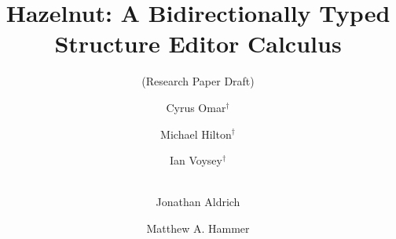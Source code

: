 \documentclass{llncs}
\begin{document}
%
\frontmatter          %

\mainmatter              %
%
\title{Hazelnut: A Bidirectionally Typed \\ Structure Editor Calculus}
\subtitle{(Research Paper Draft)}
%
%
\author{Cyrus Omar$^\dagger$ \and Michael Hilton$^\dagger$ \and
Ian Voysey$^\dagger$ \and \\Jonathan Aldrich \and Matthew A. Hammer}
%
%
%
\end{document}
